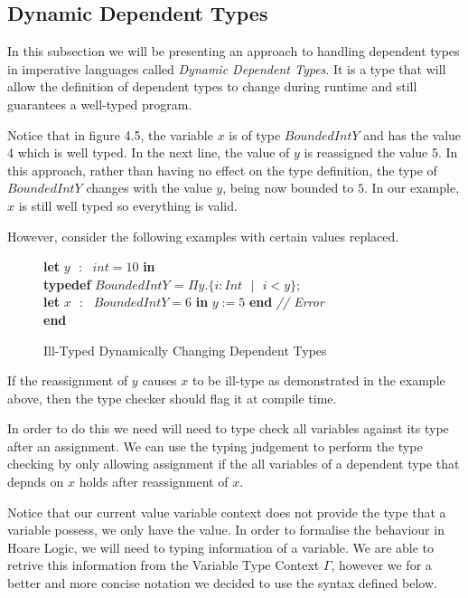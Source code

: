 \documentclass[a4paper,12pt]{report}
\newenvironment{tabs}[1]
 {\flushleft\TabPositions{#1}}
 {\endflushleft}
\begin{document}
\subsection{Dynamic Dependent Types}
In this subsection we will be presenting an approach to handling dependent types 
in imperative languages called \textit{Dynamic Dependent Types}. It is a type 
that will allow the definition of dependent types to change during runtime and 
still guarantees a well-typed program. 

\par
Notice that in figure 4.5, the variable $x$ is 
of type $BoundedIntY$ and has the value 4 which is well typed. In the next line, 
the value of $y$ is reassigned the value 5. In this approach, rather than having 
no effect on the type definition, the type of $BoundedIntY$ changes with the 
value $y$, being now bounded to $5$. In our example, $x$ is still well typed so 
everything is valid. 


\par
However, consider the following examples with certain values replaced. 

\begin{figure} [H]
  \begin{tabs}{1cm,2cm}
    \textbf{let }$y\text{ }:\text{ } int = 10$ \textbf{ in } \\
    \tab\textbf{typedef }$BoundedIntY$ = $\Pi y. \{i : Int\text{ }|\text{ }i < y\}$; \\ 
    \tab\textbf{let }$x\text{ }:\text{ }BoundedIntY = 6$ \textbf{ in }$y := 5$\textbf { end }\textit{// Error}\\
    \textbf {end}
  \end{tabs}  
  \caption{Ill-Typed Dynamically Changing Dependent Types}
\end{figure}

\par
If the reassignment of $y$ causes $x$ to be ill-type as demonstrated in the 
example above, then the type checker should flag it at compile time. 

\par
In order to do this we need will need to type check all variables against its 
type after an assignment. We can use the typing judgement to perform the 
type checking by only allowing assignment if the all variables of a dependent 
type that depnds on $x$ holds after reassignment of $x$.

\par
Notice that our current value variable context does not 
provide the type that a variable possess, we only have the value. 
In order to formalise the behaviour in Hoare Logic, we will need to typing 
information of a variable. We are able to retrive this information from the 
Variable Type Context $\Gamma$, however we for a better and more concise 
notation we decided to use the syntax defined below.
\end{document}
